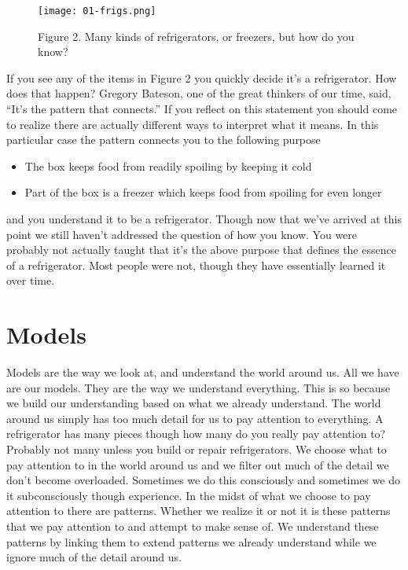 \documentclass[]{memoir}
\makeatletter
\def\maxwidth{\ifdim\Gin@nat@width>\linewidth\linewidth
\else\Gin@nat@width\fi}
\let\Oldincludegraphics\includegraphics
\renewcommand{\includegraphics}[1]{\Oldincludegraphics[width=\maxwidth]{#1}}
\makeatother
\begin{document}
\begin{figure}[htbp]
\centering
\texttt{[image: 01-frigs.png]}
\caption{Figure 2. Many kinds of refrigerators, or freezers, but how do
you know?}
\end{figure}

If you see any of the items in Figure 2 you quickly decide it's a
refrigerator. How does that happen? Gregory Bateson, one of the great
thinkers of our time, said, ``It's the pattern that connects.'' If you
reflect on this statement you should come to realize there are actually
different ways to interpret what it means. In this particular case the
pattern connects you to the following purpose

\begin{itemize}
\itemsep1pt\parskip0pt
\item
  The box keeps food from readily spoiling by keeping it cold
\item
  Part of the box is a freezer which keeps food from spoiling for even
  longer
\end{itemize}

and you understand it to be a refrigerator. Though now that we've
arrived at this point we still haven't addressed the question of how you
know. You were probably not actually taught that it's the above purpose
that defines the essence of a refrigerator. Most people were not, though
they have essentially learned it over time.

\section{Models}

Models are the way we look at, and understand the world around us. All
we have are our models. They are the way we understand everything. This
is so because we build our understanding based on what we already
understand. The world around us simply has too much detail for us to pay
attention to everything. A refrigerator has many pieces though how many
do you really pay attention to? Probably not many unless you build or
repair refrigerators. We choose what to pay attention to in the world
around us and we filter out much of the detail we don't become
overloaded. Sometimes we do this consciously and sometimes we do it
subconsciously though experience. In the midst of what we choose to pay
attention to there are patterns. Whether we realize it or not it is
these patterns that we pay attention to and attempt to make sense of. We
understand these patterns by linking them to extend patterns we already
understand while we ignore much of the detail around us.
\end{document}

